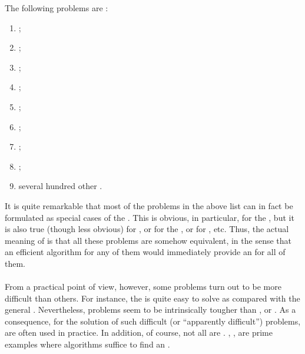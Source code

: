 \begin{proposition}
The following problems are :
\begin{enumerate}
 \item {};
 \item {};
 \item {};
 \item {};
 \item {};
 \item {};
 \item {};
 \item {};
 \item several hundred other .
\end{enumerate}
\end{proposition}

It is quite remarkable that most of the problems in the above list can in fact be formulated as special cases of the . This is obvious, in particular, for the , but it is also true (though less obvious) for , or for the , or for , etc. Thus, the actual meaning of  is that all these  problems are somehow equivalent, in the sense that an efficient algorithm for any of them would immediately provide an  for all of them.

\paragraph{}
From a practical point of view, however, some  problems turn out to be more difficult than others. For instance, the  is quite easy to solve as compared with the general . Nevertheless,  problems seem to be intrinsically tougher than ,  or . As a consequence, for the solution of such difficult (or ``apparently difficult'') problems,  are often used in practice. In addition, of course, not all  are . , ,  are prime examples where  algorithms suffice to find an .

